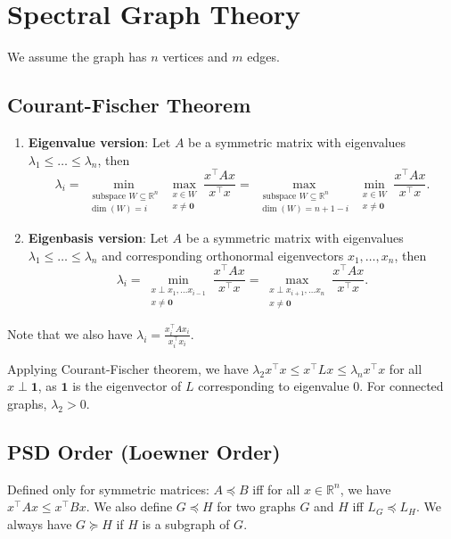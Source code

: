 \section{Spectral Graph Theory}

We assume the graph has $n$ vertices and $m$ edges.

\subsection{Courant-Fischer Theorem}
\begin{enumerate}
    \item \textbf{Eigenvalue version}: Let $A$ be a symmetric matrix with eigenvalues $\lambda_1 \le \dots \le \lambda_n$, then 
    $$\lambda_{i}=\min _{\substack{\text { subspace } W \subseteq \mathbb{R}^{n} \\ \operatorname{dim}(W)=i}} \max _{\substack{x \in W \\ x \neq \mathbf{0}}} \frac{x^{\top} A x}{x^{\top} x} = \max _{\substack{\text { subspace } W \subseteq \mathbb{R}^{n} \\ \operatorname{dim}(W)=n+1-i}} \min _{\substack{x \in W\\ x \neq \mathbf{0}}} \frac{x^{\top} A x}{x^{\top} x}.$$
    \item \textbf{Eigenbasis version}: Let $A$ be a symmetric matrix with eigenvalues $\lambda_1 \le \dots \le \lambda_n$ and corresponding orthonormal eigenvectors $x_1, \dots, x_n$, then
    $$\lambda_{i}=\min _{\substack{x \perp x_{1}, \ldots x_{i-1} \\ x \neq \mathbf{0}}} \frac{x^{\top} A x}{x^{\top} x} = \max _{\substack{x \perp x_{i+1}, \ldots x_{n} \\ x \neq \mathbf{0}}} \frac{x^{\top} A x}{x^{\top} x}.$$
\end{enumerate}
Note that we also have $\lambda_i = \frac{x_i^\top A x_i}{x_i^\top x_i}$.

Applying Courant-Fischer theorem, we have $\lambda_2 x^\top x  \le x^\top L x \le \lambda_n x^\top x$ for all $x \perp \boldsymbol{1}$, as $\boldsymbol{1}$ is the eigenvector of $L$ corresponding to eigenvalue $0$. For connected graphs, $\lambda_2 > 0$.

\subsection{PSD Order (Loewner Order)}

Defined only for symmetric matrices: $A \preceq B$ iff for all $x \in \mathbb{R}^{n}$, we have $x^{\top} A x \leq x^{\top} B x$. We also define $G \preceq H$ for two graphs $G$ and $H$ iff $L_G \preceq L_H$. We always have $G \succeq H$ if $H$ is a subgraph of $G$.

